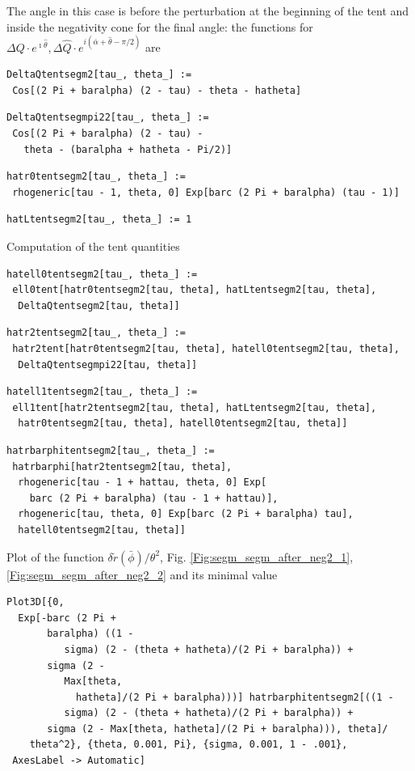 \documentclass[reqno]{amsart}
\theoremstyle{definition} \newtheorem{definition}{Definition}[section]
\theoremstyle{definition} \newtheorem{remark}[definition]{Remark}
\theoremstyle{plain} \newtheorem{lemma}[definition]{Lemma}
\theoremstyle{plain} \newtheorem{proposition}[definition]{Proposition}
\theoremstyle{plain} \newtheorem{theorem}[definition]{Theorem}
\theoremstyle{plain} \newtheorem{corollary}[definition]{Corollary}
\theoremstyle{definition} \newtheorem{example}[definition]{Example}
\theoremstyle{plain} \newtheorem{claim}[clai]{Claim}
\theoremstyle{definition} \newtheorem{assumption}[definition]{Assumption}
\theoremstyle{definition} \newtheorem{observation}[definition]{Observation}
\newcommand{\1}{\mathbbm 1}
\newcommand{\smed}{\medskip}
\newcommand{\sbig}{\bigskip}
\renewcommand{\i}{\imath}
\numberwithin{equation}{section} %
\theoremstyle{plain} \newtheorem*{theorem*}{Theorem}
\theoremstyle{plain} \newtheorem{mthm}[maintheorem]{Main Theorem}
\theoremstyle{plain} \newtheorem*{mthm*}{Main Theorem}
\theoremstyle{plain} \newtheorem*{conjecture*}{Conjecture}
\theoremstyle{plain} \newtheorem{conjecture}[definition]{Conjecture}
\theoremstyle{plain} \newtheorem*{problem*}{Problem}
\begin{document}
\sbig


\sbig

\noindent The angle in this case is before the perturbation at the beginning of the tent and inside the negativity cone for the final angle: the functions for $\Delta Q \cdot e^{\i\hat \theta}, \Delta \hat Q \cdot e^{i(\bar \alpha+ \hat \theta - \pi/2)}$ are
\smed
\begin{verbatim}
DeltaQtentsegm2[tau_, theta_] := 
 Cos[(2 Pi + baralpha) (2 - tau) - theta - hatheta]
\end{verbatim}
\begin{verbatim}
DeltaQtentsegmpi22[tau_, theta_] := 
 Cos[(2 Pi + baralpha) (2 - tau) - 
   theta - (baralpha + hatheta - Pi/2)]
\end{verbatim}
\begin{verbatim}
hatr0tentsegm2[tau_, theta_] := 
 rhogeneric[tau - 1, theta, 0] Exp[barc (2 Pi + baralpha) (tau - 1)]
\end{verbatim}
\begin{verbatim}
hatLtentsegm2[tau_, theta_] := 1
\end{verbatim}
\smed
Computation of the tent quantities
\smed
\begin{verbatim}
hatell0tentsegm2[tau_, theta_] := 
 ell0tent[hatr0tentsegm2[tau, theta], hatLtentsegm2[tau, theta], 
  DeltaQtentsegm2[tau, theta]]
\end{verbatim}
\begin{verbatim}
hatr2tentsegm2[tau_, theta_] := 
 hatr2tent[hatr0tentsegm2[tau, theta], hatell0tentsegm2[tau, theta], 
  DeltaQtentsegmpi22[tau, theta]]
\end{verbatim}
\begin{verbatim}
hatell1tentsegm2[tau_, theta_] := 
 ell1tent[hatr2tentsegm2[tau, theta], hatLtentsegm2[tau, theta], 
  hatr0tentsegm2[tau, theta], hatell0tentsegm2[tau, theta]]
\end{verbatim}
\begin{verbatim}
hatrbarphitentsegm2[tau_, theta_] := 
 hatrbarphi[hatr2tentsegm2[tau, theta], 
  rhogeneric[tau - 1 + hattau, theta, 0] Exp[
    barc (2 Pi + baralpha) (tau - 1 + hattau)], 
  rhogeneric[tau, theta, 0] Exp[barc (2 Pi + baralpha) tau], 
  hatell0tentsegm2[tau, theta]]
\end{verbatim}
\smed
Plot of the function $\delta \check r(\bar \phi)/\theta^2$, Fig. \ref{Fig:segm_segm_after_neg2_1}, \ref{Fig:segm_segm_after_neg2_2} and its minimal value
\smed
\begin{verbatim}
Plot3D[{0, 
  Exp[-barc (2 Pi + 
       baralpha) ((1 - 
          sigma) (2 - (theta + hatheta)/(2 Pi + baralpha)) + 
       sigma (2 - 
          Max[theta, 
            hatheta]/(2 Pi + baralpha)))] hatrbarphitentsegm2[((1 - 
          sigma) (2 - (theta + hatheta)/(2 Pi + baralpha)) + 
       sigma (2 - Max[theta, hatheta]/(2 Pi + baralpha))), theta]/
    theta^2}, {theta, 0.001, Pi}, {sigma, 0.001, 1 - .001}, 
 AxesLabel -> Automatic]
\end{verbatim}
\end{document}
